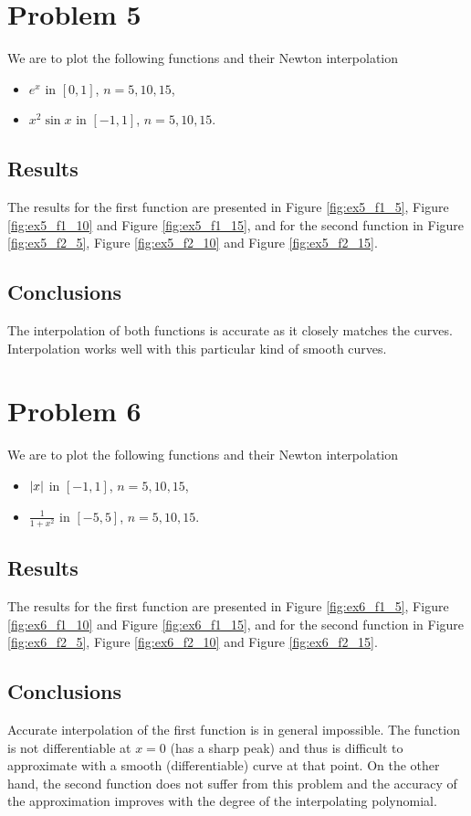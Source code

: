 \documentclass[12pt, a4paper]{article}
\DeclarePairedDelimiter\abs{\lvert}{\rvert}
\begin{document}
\section{Problem 5}
We are to plot the following functions and their Newton interpolation
\begin{itemize}
  \item $e^x$ in $[0, 1]$, $n = 5, 10, 15$,
  \item $x^2 \sin x$ in $[-1, 1]$, $n = 5, 10, 15$.
\end{itemize}

\subsection{Results}
The results for the first function are presented in Figure \ref{fig:ex5_f1_5},
Figure \ref{fig:ex5_f1_10} and Figure \ref{fig:ex5_f1_15}, and for the second
function in Figure \ref{fig:ex5_f2_5}, Figure \ref{fig:ex5_f2_10} and Figure
\ref{fig:ex5_f2_15}.

\subsection{Conclusions}
The interpolation of both functions is accurate as it closely matches the
curves. Interpolation works well with this particular kind of smooth curves.

\section{Problem 6}
We are to plot the following functions and their Newton interpolation
\begin{itemize}
  \item $\abs{x}$ in $[-1, 1]$, $n = 5, 10, 15$,
  \item $\frac{1}{1+x^2}$ in $[-5, 5]$, $n = 5, 10, 15$.
\end{itemize}

\subsection{Results}
The results for the first function are presented in Figure \ref{fig:ex6_f1_5},
Figure \ref{fig:ex6_f1_10} and Figure \ref{fig:ex6_f1_15}, and for the second
function in Figure \ref{fig:ex6_f2_5}, Figure \ref{fig:ex6_f2_10} and Figure
\ref{fig:ex6_f2_15}.

\subsection{Conclusions}
Accurate interpolation of the first function is in general impossible. The
function is not differentiable at $x = 0$ (has a sharp peak) and thus is
difficult to approximate with a smooth (differentiable) curve at that point. On
the other hand, the second function does not suffer from this problem and the
accuracy of the approximation improves with the degree of the interpolating
polynomial.
\end{document}
